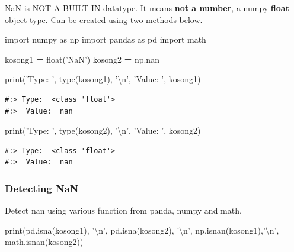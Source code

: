 \documentclass[
]{book}
\newenvironment{Shaded}{\begin{snugshade}}{\end{snugshade}}
\newcommand{\BuiltInTok}[1]{#1}
\newcommand{\CharTok}[1]{\textcolor[rgb]{0.5,0.5,0.5}{#1}}
\newcommand{\ImportTok}[1]{#1}
\newcommand{\NormalTok}[1]{#1}
\newcommand{\OperatorTok}[1]{\textcolor[rgb]{0.43,0.43,0.43}{\textbf{#1}}}
\newcommand{\StringTok}[1]{\textcolor[rgb]{0.5,0.5,0.5}{#1}}
\begin{document}
NaN is NOT A BUILT-IN datatype. It means \textbf{not a number}, a numpy \textbf{float} object type. Can be created using two methods below.

\begin{Shaded}
\begin{Highlighting}[]
\ImportTok{import}\NormalTok{ numpy }\ImportTok{as}\NormalTok{ np}
\ImportTok{import}\NormalTok{ pandas }\ImportTok{as}\NormalTok{ pd}
\ImportTok{import}\NormalTok{ math}

\NormalTok{kosong1 }\OperatorTok{=} \BuiltInTok{float}\NormalTok{(}\StringTok{'NaN'}\NormalTok{)}
\NormalTok{kosong2 }\OperatorTok{=}\NormalTok{ np.nan}

\BuiltInTok{print}\NormalTok{(}\StringTok{'Type: '}\NormalTok{, }\BuiltInTok{type}\NormalTok{(kosong1), }\StringTok{'}\CharTok{\textbackslash{}n}\StringTok{'}\NormalTok{,}
       \StringTok{'Value: '}\NormalTok{, kosong1)}
\end{Highlighting}
\end{Shaded}

\begin{verbatim}
#:> Type:  <class 'float'> 
#:>  Value:  nan
\end{verbatim}

\begin{Shaded}
\begin{Highlighting}[]
\BuiltInTok{print}\NormalTok{(}\StringTok{'Type: '}\NormalTok{, }\BuiltInTok{type}\NormalTok{(kosong2), }\StringTok{'}\CharTok{\textbackslash{}n}\StringTok{'}\NormalTok{,}
       \StringTok{'Value: '}\NormalTok{, kosong2)}
\end{Highlighting}
\end{Shaded}

\begin{verbatim}
#:> Type:  <class 'float'> 
#:>  Value:  nan
\end{verbatim}

\hypertarget{detecting-nan}{%
\subsubsection{Detecting NaN}\label{detecting-nan}}

Detect nan using various function from panda, numpy and math.

\begin{Shaded}
\begin{Highlighting}[]
\BuiltInTok{print}\NormalTok{(pd.isna(kosong1), }\StringTok{'}\CharTok{\textbackslash{}n}\StringTok{'}\NormalTok{,}
\NormalTok{      pd.isna(kosong2), }\StringTok{'}\CharTok{\textbackslash{}n}\StringTok{'}\NormalTok{,}
\NormalTok{      np.isnan(kosong1),}\StringTok{'}\CharTok{\textbackslash{}n}\StringTok{'}\NormalTok{,}
\NormalTok{      math.isnan(kosong2))}
\end{Highlighting}
\end{Shaded}
\end{document}
